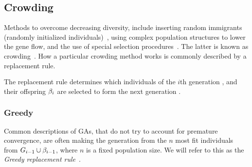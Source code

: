 \subsection{Crowding}\label{sec:replacementrules}
Methods to overcome decreasing diversity, include inserting random immigrants (randomly initialized individuals)~\cite{Cobb93geneticalgorithms}, using complex population structures to lower the gene flow, and the use of special selection procedures~\cite{ursem2002diversity}. The latter is known as crowding~\cite{DeJong:1975:ABC:907087}. How a particular crowding method works is commonly described by a replacement rule.

The replacement rule determines which individuals of the $i$th generation , and their offspring $\beta_{i}$ are selected to form the next generation .

\subsubsection{Greedy}
Common descriptions of GAs, that do not try to account for premature convergence,
are often making the generation  from the $n$ most fit individuals from $G_{i-1} \cup \beta_{i-1}$, where $n$ is a fixed population size. We will refer to this as the \emph{Greedy replacement rule}~\cite{masterThesisGANN}.


%

